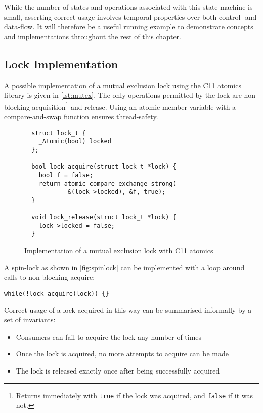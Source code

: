 While the number of states and operations associated with this state
machine is small, asserting correct usage involves temporal properties
over both control- and data-flow. It will therefore be a useful running
example to demonstrate concepts and implementations throughout the rest
of this chapter.

\subsection{Lock Implementation}

A possible implementation of a mutual exclusion lock using the C11
atomics library is given in \autoref{lst:mutex}. The only operations
permitted by the lock are non-blocking acquisition\footnote{Returns immediately
with \texttt{true} if the lock was acquired, and
\texttt{false} if it was not.} and release. Using an atomic
member variable with a compare-and-swap function ensures thread-safety.

\begin{figure}[ht]
  \begin{verbatim}
  struct lock_t {
    _Atomic(bool) locked
  };

  bool lock_acquire(struct lock_t *lock) {
    bool f = false;
    return atomic_compare_exchange_strong(
            &(lock->locked), &f, true);
  }

  void lock_release(struct lock_t *lock) {
    lock->locked = false;
  }
  \end{verbatim}
  \caption{Implementation of a mutual exclusion lock with C11 atomics}
  \label{lst:mutex}
\end{figure}

A spin-lock as shown in \autoref{fig:spinlock} can be implemented with a
loop around calls to non-blocking acquire:

\begin{verbatim}
while(!lock_acquire(lock)) {}
\end{verbatim}

Correct usage of a lock acquired in this way can be summarised
informally by a set of invariants:
\begin{itemize}
  \item Consumers can fail to acquire the lock any number of times
  \item Once the lock is acquired, no more attempts to acquire can be made
  \item The lock is released exactly once after being successfully acquired
\end{itemize}

